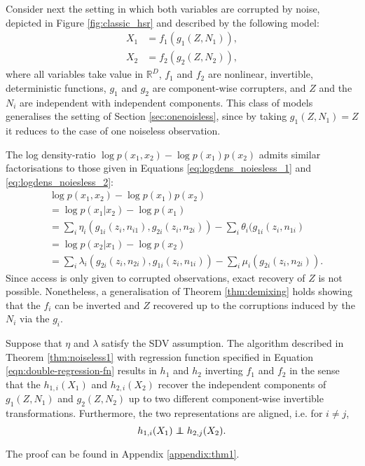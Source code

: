 Consider next the setting in which both variables are corrupted by noise, depicted in Figure \ref{fig:classic_hsr} and described by the following model:
\begin{align*}
X_{1}&={f}_{1}({g}_{1}({Z},N_{1})),  \\
X_{2}&={f}_{2}({g}_{2}({Z},N_{2})),
\end{align*}
where all variables take value in $\mathbb{R}^D$, ${f}_{1}$ and ${f}_{2}$ are nonlinear, invertible, deterministic functions,
${g}_{1}$ and ${g}_{2}$ are component-wise corrupters, and $Z$ and the $N_i$ are independent with independent components.
This class of models generalises the setting of Section \ref{sec:onenoisless}, since by taking ${g}_1(Z, N_1) = Z$ it reduces to the case of one noiseless observation.

The log density-ratio $\log p({x}_1, {x}_2) - \log p({x}_1)p({x}_2)$ admits similar factorisations to those given in Equations \ref{eq:logdens_noiesless_1} and \ref{eq:logdens_noiesless_2}:
\begin{align}
&\log p({x}_1, {x}_2) - \log p({x}_1) p({x}_2) \nonumber\\
&= \log p({x}_1 | {x}_2) - \log p({x}_1)\nonumber\\
&= \sum_i \eta_i(g_{1i}(z_i, n_{i1}), g_{2i}(z_i, n_{2i})) - \sum_i \theta_i(g_{1i}(z_i, n_{1i}) \label{eq:noisylogdens_1}\\
&= \log p({x}_2 | {x}_1) - \log p({x}_2) \nonumber\\
&= \sum_i \lambda_i(g_{2i}(z_i, n_{2i}), g_{1i}(z_i, n_{1i})) - \sum_i \mu_i(g_{2i}(z_i, n_{2i})). \label{eq:noisylogdens_2}
\end{align}
Since access is only given to corrupted observations, exact recovery of $Z$ is not possible.
Nonetheless, a generalisation of Theorem \ref{thm:demixing} holds showing that the ${f}_i$ can be inverted and $Z$ recovered up to the corruptions induced by the $N_i$ via the ${g}_i$.

\medskip

\begin{theorem}\label{thm:two-noisy-views}
	Suppose that ${\eta}$ and ${\lambda}$ satisfy the SDV assumption.
	The algorithm described in Theorem \ref{thm:noiseless1} with regression function specified in Equation \ref{eqn:double-regression-fn} results in ${h}_1$ and ${h}_2$ inverting ${f}_1$ and ${f}_2$ in the sense that the $h_{1,i}({X}_1)$ and $h_{2,i}({X}_2)$ recover the independent components of ${g}_1({Z}, {N}_1)$ and ${g}_2({Z}, {N}_2)$ up to two different component-wise invertible transformations. Furthermore, the two representations are aligned, i.e. for $i\not=j$,
	\begin{equation*}
	h_{1,i}({X}_{1})\independent h_{2,j}({X}_{2}).
	\end{equation*}
\end{theorem}
The proof can be found in Appendix \ref{appendix:thm1}.

